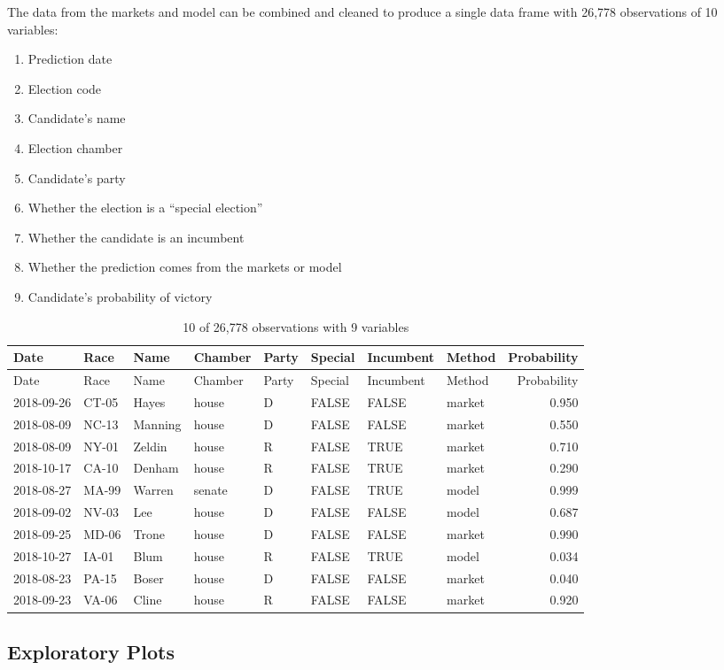 \documentclass[]{article}
\providecommand{\tightlist}{%
  \setlength{\itemsep}{0pt}\setlength{\parskip}{0pt}}
\begin{document}
The data from the markets and model can be combined and cleaned to
produce a single data frame with 26,778 observations of 10 variables:

\begin{enumerate}
\def\labelenumi{\arabic{enumi}.}
\tightlist
\item
  Prediction date
\item
  Election code
\item
  Candidate's name
\item
  Election chamber
\item
  Candidate's party
\item
  Whether the election is a ``special election''
\item
  Whether the candidate is an incumbent
\item
  Whether the prediction comes from the markets or model
\item
  Candidate's probability of victory
\end{enumerate}

\begin{longtable}[]{@{}llllllllr@{}}
\caption{10 of 26,778 observations with 9 variables}\tabularnewline
\toprule
Date & Race & Name & Chamber & Party & Special & Incumbent & Method &
Probability\tabularnewline
\midrule
\endfirsthead
\toprule
Date & Race & Name & Chamber & Party & Special & Incumbent & Method &
Probability\tabularnewline
\midrule
\endhead
2018-09-26 & CT-05 & Hayes & house & D & FALSE & FALSE & market &
0.950\tabularnewline
2018-08-09 & NC-13 & Manning & house & D & FALSE & FALSE & market &
0.550\tabularnewline
2018-08-09 & NY-01 & Zeldin & house & R & FALSE & TRUE & market &
0.710\tabularnewline
2018-10-17 & CA-10 & Denham & house & R & FALSE & TRUE & market &
0.290\tabularnewline
2018-08-27 & MA-99 & Warren & senate & D & FALSE & TRUE & model &
0.999\tabularnewline
2018-09-02 & NV-03 & Lee & house & D & FALSE & FALSE & model &
0.687\tabularnewline
2018-09-25 & MD-06 & Trone & house & D & FALSE & FALSE & market &
0.990\tabularnewline
2018-10-27 & IA-01 & Blum & house & R & FALSE & TRUE & model &
0.034\tabularnewline
2018-08-23 & PA-15 & Boser & house & D & FALSE & FALSE & market &
0.040\tabularnewline
2018-09-23 & VA-06 & Cline & house & R & FALSE & FALSE & market &
0.920\tabularnewline
\bottomrule
\end{longtable}

\subsection{Exploratory Plots}\label{exploratory-plots}
\end{document}
